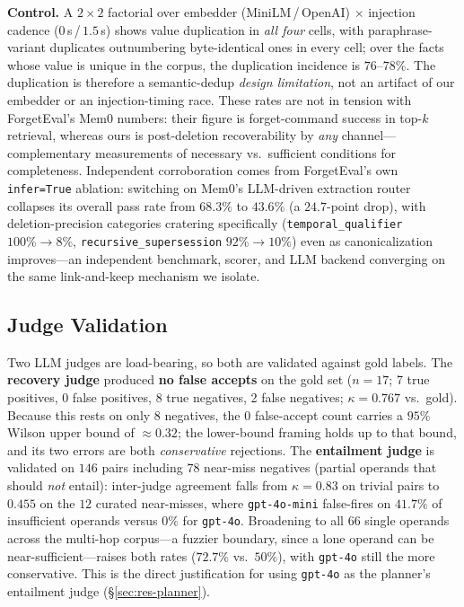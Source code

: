\documentclass[10pt,twocolumn,letterpaper]{article}
\theoremstyle{definition}
\theoremstyle{plain}
\newcommand{\code}[1]{\texttt{#1}}
\begin{document}
\textbf{Control.} A $2{\times}2$ factorial over embedder (MiniLM\,/\,OpenAI)
$\times$ injection cadence ($0\,$s\,/\,$1.5\,$s) shows value duplication
in \emph{all four} cells, with paraphrase-variant duplicates outnumbering
byte-identical ones in every cell; over the facts whose value is unique in the
corpus, the duplication incidence is $76$--$78\%$. The
duplication is therefore a semantic-dedup \emph{design limitation}, not an artifact
of our embedder or an injection-timing race. These rates are not in tension with
ForgetEval's Mem0 numbers: their figure is forget-command success in top-$k$
retrieval, whereas ours is post-deletion recoverability by \emph{any}
channel---complementary measurements of necessary vs.\ sufficient conditions for
completeness. Independent corroboration comes from ForgetEval's own \code{infer=True}
ablation: switching on Mem0's LLM-driven extraction router collapses its overall
pass rate from $68.3\%$ to $43.6\%$ (a $24.7$-point drop), with deletion-precision
categories cratering specifically (\code{temporal\_qualifier} $100\%\to8\%$,
\code{recursive\_supersession} $92\%\to10\%$) even as canonicalization improves---an
independent benchmark, scorer, and LLM backend converging on the same
link-and-keep mechanism we isolate.

\subsection{Judge Validation}\label{sec:res-judge}

Two LLM judges are load-bearing, so both are validated against gold labels. The
\textbf{recovery judge} produced \textbf{no false accepts} on the gold set
($n{=}17$; 7 true positives, 0 false positives, 8 true negatives, 2 false
negatives; $\kappa=0.767$ vs.\ gold). Because this rests on only $8$ negatives, the
$0$ false-accept count carries a $95\%$ Wilson upper bound of $\approx0.32$; the
lower-bound framing holds up to that bound, and its two errors are both
\emph{conservative} rejections. The \textbf{entailment judge} is validated on $146$
pairs including $78$ near-miss negatives (partial operands that should
\emph{not} entail): inter-judge agreement falls from $\kappa=0.83$ on trivial pairs
to $0.455$ on the $12$ curated near-misses, where \code{gpt-4o-mini} false-fires on
$41.7\%$ of insufficient operands versus $0\%$ for \code{gpt-4o}. Broadening to all
$66$ single operands across the multi-hop corpus---a fuzzier boundary, since a lone
operand can be near-sufficient---raises both rates ($72.7\%$ vs.\ $50\%$), with
\code{gpt-4o} still the more conservative. This is the direct
justification for using \code{gpt-4o} as the planner's entailment judge
(\S\ref{sec:res-planner}).
\end{document}
